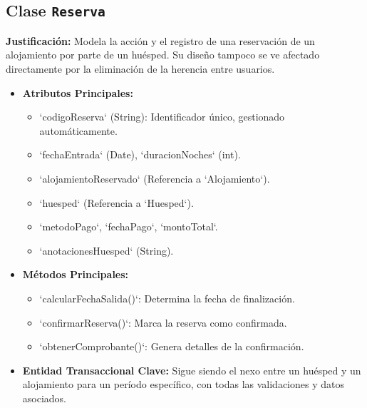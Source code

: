 \documentclass[journal]{IEEEtran}
\begin{document}
\subsection{Clase \texttt{Reserva}}
\textbf{Justificación:} Modela la acción y el registro de una reservación de un alojamiento por parte de un huésped. Su diseño tampoco se ve afectado directamente por la eliminación de la herencia entre usuarios.
\begin{itemize}
    \item \textbf{Atributos Principales:}
        \begin{itemize}
            \item `codigoReserva` (String): Identificador único, gestionado automáticamente.
            \item `fechaEntrada` (Date), `duracionNoches` (int).
            \item `alojamientoReservado` (Referencia a `Alojamiento`).
            \item `huesped` (Referencia a `Huesped`).
            \item `metodoPago`, `fechaPago`, `montoTotal`.
            \item `anotacionesHuesped` (String).
        \end{itemize}
    \item \textbf{Métodos Principales:}
        \begin{itemize}
            \item `calcularFechaSalida()`: Determina la fecha de finalización.
            \item `confirmarReserva()`: Marca la reserva como confirmada.
            \item `obtenerComprobante()`: Genera detalles de la confirmación.
        \end{itemize}
    \item \textbf{Entidad Transaccional Clave:} Sigue siendo el nexo entre un huésped y un alojamiento para un período específico, con todas las validaciones y datos asociados.
\end{itemize}
\end{document}
